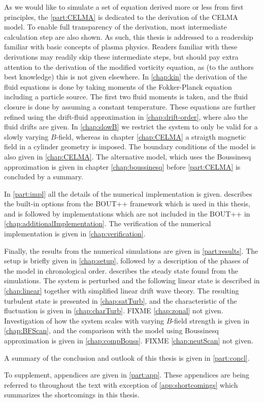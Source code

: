 As we would like to simulate a set of equation derived more or less from first principles, the \cref{part:CELMA} is dedicated to the derivation of the CELMA model.
To enable full transparency of the derivation, most intermediate calculation step are also shown.
As such, this thesis is addressed to a readership familiar with basic concepts of plasma physics.
Readers familiar with these derivations may readily skip these intermediate steps, but should pay extra attention to the derivation of the modified vorticity equation, as (to the authors best knowledge) this is not given elsewhere.
In \cref{chap:kin} the derivation of the fluid equations is done by taking moments of the Fokker-Planck equation including a particle source.
The first two fluid moments is taken, and the fluid closure is done by assuming a constant temperature.
These equations are further refined using the drift-fluid approximation in \cref{chap:drift-order}, where also the fluid drifts are given.
In \cref{chap:slowB} we restrict the system to only be valid for a slowly varying $B$-field, whereas in chapter \cref{chap:CELMA} a straigth magnetic field in a cylinder geometry is imposed.
The boundary conditions of the model is also given in \cref{chap:CELMA}.
The alternative model, which uses the Boussinesq approximation is given in chapter \cref{chap:boussinesq} before \cref{part:CELMA} is concluded by a summary.

In \cref{part:impl} all the details of the numerical implementation is given.
 describes the built-in options from the BOUT++ framework which is used in this thesis, and is followed by implementations which are not included in the BOUT++ in \cref{chap:additionalImplementation}.
The verification of the numerical implementation is given in \cref{chap:verification}.

Finally, the results from the numerical simulations are given in \cref{part:results}.
The setup is briefly given in \cref{chap:setup}, followed by a description of the phases of the model in chronological order.
 describes the steady state found from the simulations.
The system is perturbed and the following linear state is described in \cref{chap:linear} together with simplified linear drift wave theory.
The resulting turbulent state is presented in \cref{chap:satTurb}, and the characteristic of the fluctuation is given in \cref{chap:charTurb}.
FIXME \cref{chap:zonal} not given.
Investigation of how the system scales with varying $B$-field strength is given in \cref{chap:BFScan}, and the comparison with the model using Boussinesq approximation is given in \cref{chap:compBouss}.
FIXME \cref{chap:neutScan} not given.

A summary of the conclusion and outlook of this thesis is given in \cref{part:concl}.

To supplement, appendices are given in \cref{part:app}. These appendices are being referred to throughout the text with exception of \cref{app:shortcomings} which summarizes the shortcomings in this thesis.

